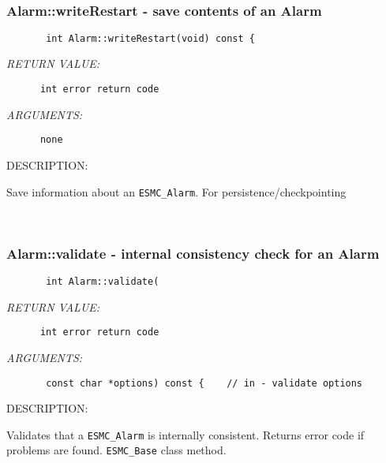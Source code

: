  
\mbox{}\hrulefill\ 
 
\subsubsection [Alarm::writeRestart] {Alarm::writeRestart - save contents of an Alarm}


  
\begin{verbatim}       int Alarm::writeRestart(void) const {\end{verbatim}{\em RETURN VALUE:}
\begin{verbatim}      int error return code\end{verbatim}{\em ARGUMENTS:}
\begin{verbatim}      none\end{verbatim}
{\sf DESCRIPTION:\\ }


        Save information about an {\tt ESMC\_Alarm}.
        For persistence/checkpointing
   
 
\mbox{}\hrulefill\ 
 
\subsubsection [Alarm::validate] {Alarm::validate - internal consistency check for an Alarm}


  
\begin{verbatim}       int Alarm::validate(\end{verbatim}{\em RETURN VALUE:}
\begin{verbatim}      int error return code\end{verbatim}{\em ARGUMENTS:}
\begin{verbatim}       const char *options) const {    // in - validate options\end{verbatim}
{\sf DESCRIPTION:\\ }


        Validates that a {\tt ESMC\_Alarm} is internally consistent.
        Returns error code if problems are found.  {\tt ESMC\_Base}
        class method.
   
 
